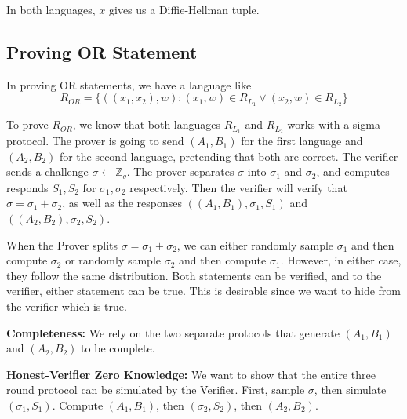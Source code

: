 In both languages, $x$ gives us a Diffie-Hellman tuple.

\subsection{Proving OR Statement}

In proving OR statements, we have a language like
\[ R_{OR} = \{ ((x_1, x_2), w): (x_1, w) \in R_{L_1} \vee (x_2, w) \in R_{L_2} \} \]

To prove $R_{OR}$, we know that both languages $R_{L_1}$ and $R_{L_2}$ works with a sigma protocol. The prover is going to send $(A_1, B_1)$ for the first language and $(A_2, B_2)$ for the second language, pretending that both are correct. The verifier sends a challenge $\sigma \gets \mathbb{Z}_q$. The prover separates $\sigma$ into $\sigma_1$ and $\sigma_2$, and computes responds $S_1, S_2$ for $\sigma_1, \sigma_2$ respectively. Then the verifier will verify that $\sigma = \sigma_1 + \sigma_2$, as well as the responses $((A_1, B_1), \sigma_1, S_1)$ and $((A_2, B_2), \sigma_2, S_2)$.


When the Prover splits $\sigma = \sigma_1 + \sigma_2$, we can either randomly sample $\sigma_1$ and then compute $\sigma_2$ or randomly sample $\sigma_2$ and then compute $\sigma_1$. However, in either case, they follow the same distribution. Both statements can be verified, and to the verifier, either statement can be true. This is desirable since we want to hide from the verifier which is true.

\textbf{Completeness:} We rely on the two separate protocols that generate $(A_1, B_1)$ and $(A_2, B_2)$ to be complete.

\textbf{Honest-Verifier Zero Knowledge:} We want to show that the entire three round protocol can be simulated by the Verifier. First, sample $\sigma$, then simulate $(\sigma_1, S_1)$. Compute $(A_1, B_1)$, then $(\sigma_2, S_2)$, then $(A_2, B_2)$.

